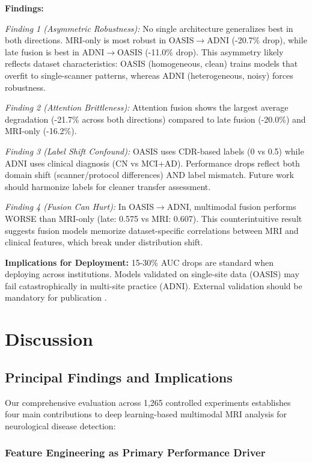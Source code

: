 \documentclass[conference]{IEEEtran}
\begin{document}
\textbf{Findings:}

\textit{Finding 1 (Asymmetric Robustness):} No single architecture generalizes best in both directions. MRI-only is most robust in OASIS$\rightarrow$ADNI (-20.7\% drop), while late fusion is best in ADNI$\rightarrow$OASIS (-11.0\% drop). This asymmetry likely reflects dataset characteristics: OASIS (homogeneous, clean) trains models that overfit to single-scanner patterns, whereas ADNI (heterogeneous, noisy) forces robustness.

\textit{Finding 2 (Attention Brittleness):} Attention fusion shows the largest average degradation (-21.7\% across both directions) compared to late fusion (-20.0\%) and MRI-only (-16.2\%).

\textit{Finding 3 (Label Shift Confound):} OASIS uses CDR-based labels (0 vs 0.5) while ADNI uses clinical diagnosis (CN vs MCI+AD). Performance drops reflect both domain shift (scanner/protocol differences) AND label mismatch. Future work should harmonize labels for cleaner transfer assessment.

\textit{Finding 4 (Fusion Can Hurt):} In OASIS$\rightarrow$ADNI, multimodal fusion performs WORSE than MRI-only (late: 0.575 vs MRI: 0.607). This counterintuitive result suggests fusion models memorize dataset-specific correlations between MRI and clinical features, which break under distribution shift.

\textbf{Implications for Deployment:} 15-30\% AUC drops are standard when deploying across institutions. Models validated on single-site data (OASIS) may fail catastrophically in multi-site practice (ADNI). External validation should be mandatory for publication \cite{Park2020}.

\section{Discussion}

\subsection{Principal Findings and Implications}

Our comprehensive evaluation across 1,265 controlled experiments establishes four main contributions to deep learning-based multimodal MRI analysis for neurological disease detection:

\subsubsection{Feature Engineering as Primary Performance Driver}
\end{document}
